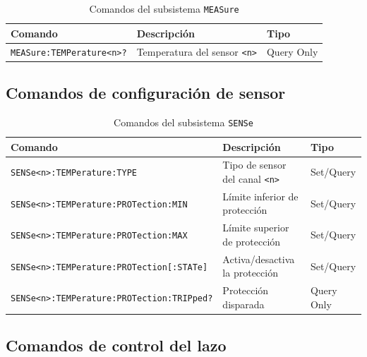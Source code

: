 \begin{table}[H]

    \caption{Comandos del subsistema \texttt{MEASure}}
    \label{tab:meas-group}
    \begin{tabular}{lll}
        \toprule
        \textbf{Comando} & \textbf{Descripción} & \textbf{Tipo} \\
        \midrule
        \texttt{MEASure:TEMPerature<n>?} & Temperatura del sensor \texttt{<n>} & Query Only \\
        \bottomrule
    \end{tabular}
\end{table}

\subsection*{Comandos de configuración de sensor}

\begin{table}[H]

    \caption{Comandos del subsistema \texttt{SENSe}}
    \label{tab:sens-group}
    \begin{tabular}{lll}
        \toprule
        \textbf{Comando} & \textbf{Descripción} & \textbf{Tipo} \\
        \midrule
        \texttt{SENSe<n>:TEMPerature:TYPE}              & Tipo de sensor del canal \texttt{<n>}      & Set/Query \\
        \texttt{SENSe<n>:TEMPerature:PROTection:MIN}    & Límite inferior de protección              & Set/Query \\
        \texttt{SENSe<n>:TEMPerature:PROTection:MAX}    & Límite superior de protección              & Set/Query \\
        \texttt{SENSe<n>:TEMPerature:PROTection[:STATe]}& Activa/desactiva la protección             & Set/Query \\
        \texttt{SENSe<n>:TEMPerature:PROTection:TRIPped?}& Protección disparada                      & Query Only \\
        \bottomrule
    \end{tabular}
\end{table}

\subsection*{Comandos de control del lazo}

